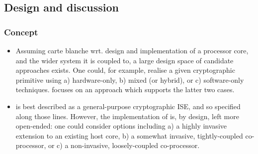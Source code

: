 
\subsection{Design and discussion}
\label{sec:bg:design}


\subsubsection{Concept}

\begin{itemize}

\item Assuming carte blanche wrt. design and implementation of a processor 
      core, and the wider system it is coupled to, a large design space of 
      candidate approaches exists.  One could, for example, realise a given 
      cryptographic primitive using
      a) hardware-only,
      b) mixed (or hybrid),
         or
      c) software-only
      techniques.
      \ISE focuses on an approach which supports the latter two cases.

\item \ISE is best described as a general-purpose cryptographic ISE, and so
      specified along those lines.  However, the implementation of \ISE is,
      by design, left more open-ended: one could consider options including
      a) a highly   invasive extension to an existing host core,
      b) a somewhat invasive, tightly-coupled co-processor,
         or
      c) a      non-invasive, loosely-coupled co-processor.


\end{itemize}
